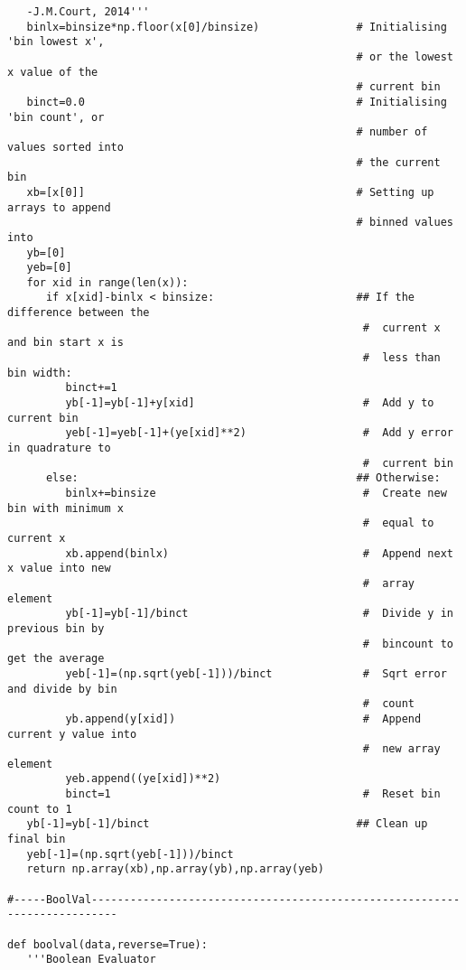 \begin{verbatim}
   -J.M.Court, 2014'''
   binlx=binsize*np.floor(x[0]/binsize)               # Initialising 'bin lowest x',
                                                      # or the lowest x value of the
                                                      # current bin
   binct=0.0                                          # Initialising 'bin count', or
                                                      # number of values sorted into 
                                                      # the current bin
   xb=[x[0]]                                          # Setting up arrays to append
                                                      # binned values into
   yb=[0]   
   yeb=[0]
   for xid in range(len(x)):
      if x[xid]-binlx < binsize:                      ## If the difference between the
                                                       #  current x and bin start x is
                                                       #  less than bin width:
         binct+=1
         yb[-1]=yb[-1]+y[xid]                          #  Add y to current bin
         yeb[-1]=yeb[-1]+(ye[xid]**2)                  #  Add y error in quadrature to
                                                       #  current bin
      else:                                           ## Otherwise:
         binlx+=binsize                                #  Create new bin with minimum x
                                                       #  equal to current x
         xb.append(binlx)                              #  Append next x value into new
                                                       #  array element
         yb[-1]=yb[-1]/binct                           #  Divide y in previous bin by
                                                       #  bincount to get the average
         yeb[-1]=(np.sqrt(yeb[-1]))/binct              #  Sqrt error and divide by bin
                                                       #  count
         yb.append(y[xid])                             #  Append current y value into
                                                       #  new array element
         yeb.append((ye[xid])**2)
         binct=1                                       #  Reset bin count to 1
   yb[-1]=yb[-1]/binct                                ## Clean up final bin
   yeb[-1]=(np.sqrt(yeb[-1]))/binct
   return np.array(xb),np.array(yb),np.array(yeb)

#-----BoolVal--------------------------------------------------------------------------

def boolval(data,reverse=True):
   '''Boolean Evaluator


\end{verbatim}
